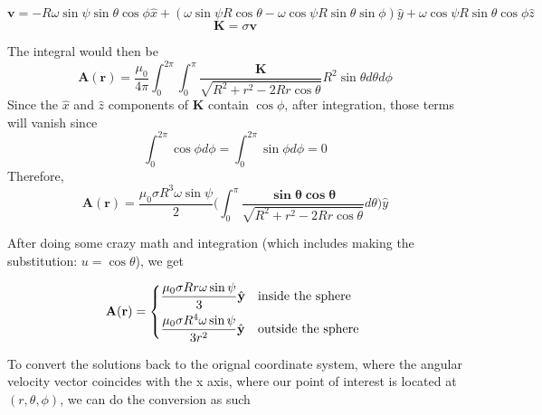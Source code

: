 $$\mathbf{v}=-R\omega\sin\psi\sin\theta\cos\phi\hat{x}+(\omega\sin\psi R\cos\theta - \omega \cos \psi R \sin \theta \sin \phi)\hat{y}+\omega \cos \psi R \sin \theta\cos\phi \hat{z}$$
$$\mathbf{K}=\sigma \mathbf{v}$$




The integral would then be
$$\mathbf{A(r)}=\frac{\mu_0}{4\pi}\int_0^{2\pi} \int_0^\pi\frac{\mathbf{K}}{\sqrt{R^2+r^2-2Rr\cos\theta}} R^2 \sin\theta d\theta d\phi$$
Since the $\hat{x}$ and $\hat{z}$ components of $\mathbf{K}$ contain $\cos\phi$, after integration, those terms will vanish since
$$\int_0^{2\pi}\cos\phi d\phi =\int_0^{2\pi}\sin\phi d\phi=0 $$
Therefore,
$$\mathbf{A(r)}=\frac{\mu_0\sigma R^3 \omega \sin \psi}{2} \bigg(\int_0^\pi\frac{\mathbf{\sin\theta \cos\theta}}{\sqrt{R^2+r^2-2Rr\cos\theta}} d\theta \bigg) \hat{y}$$

After doing some crazy math and integration (which includes making the substitution: $u=\cos\theta$), we get

$$\mathbf{A(r)} =
    \begin{dcases*}
        \frac{\mu_0\sigma Rr \omega \sin \psi}{3}\hat{y}      & \text{inside the sphere}  \\
        \frac{\mu_0\sigma R^4 \omega \sin \psi}{3 r^2}\hat{y} & \text{outside the sphere}
    \end{dcases*}$$

To convert the solutions back to the orignal coordinate system, where the angular velocity vector coincides with the x axis, where our point of interest is located at $(r,\theta,\phi)$, we can do the conversion as such

